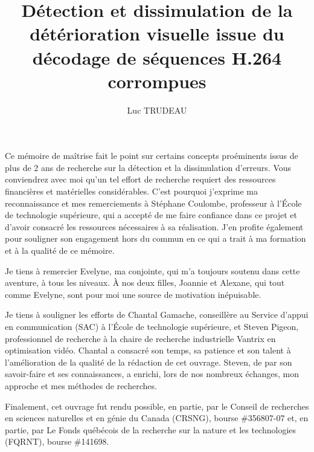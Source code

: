 \documentclass [memoire, letterpaper, oneside, 12pt]{thETS-utf8}
\title{Détection et dissimulation de la détérioration visuelle issue du décodage
de séquences H.264 corrompues}
\author{Luc TRUDEAU}
\begin{document}

\maketitle
\presentjury


\begin{remerciements}
Ce mémoire de maîtrise fait le point sur certains concepts proéminents issus de
plus de 2 ans de recherche sur la détection et la dissimulation
d’erreurs. Vous conviendrez avec moi qu’un tel effort de recherche requiert des
ressources financières et matérielles considérables. C’est pourquoi j’exprime ma
reconnaissance et mes remerciements à Stéphane Coulombe, professeur à l’École de
technologie supérieure, qui a accepté de me faire confiance dans ce projet et
d’avoir consacré les ressources nécessaires à sa réalisation. J’en profite
également pour souligner son engagement hors du commun en ce qui a trait à ma
formation et à la qualité de ce mémoire.

Je tiens à remercier Evelyne, ma conjointe, qui m’a toujours soutenu dans cette
aventure, à tous les niveaux. À nos deux filles, Joannie et Alexane, qui tout
comme Evelyne, sont pour moi une source de motivation inépuisable.

Je tiens à souligner les efforts de Chantal Gamache, conseillère au Service
d'appui en communication (SAC) à l’École de technologie supérieure, et Steven
Pigeon, professionnel de recherche à la chaire de recherche industrielle Vantrix
en optimisation vidéo. Chantal a consacré son temps, sa patience et son talent à
l’amélioration de la qualité de la rédaction de cet ouvrage. Steven, de par son
savoir-faire et ses connaissances, a enrichi, lors de nos nombreux échanges, mon
approche et mes méthodes de recherches.

Finalement, cet ouvrage fut rendu possible, en partie, par le Conseil de
recherches en sciences naturelles et en génie du Canada (CRSNG), bourse
\#356807-07 et, en partie, par Le Fonds québécois de la recherche sur la nature
et les technologies (FQRNT), bourse \#141698.
\end{remerciements}
\end{document}
